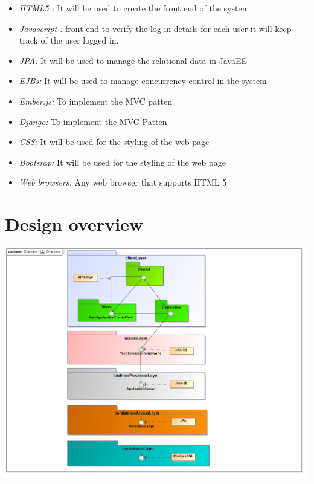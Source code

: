 \documentclass[a4paper,12pt]{article}
\begin{document}
\begin{itemize}
	\item \textit{HTML5 : }It will be used to create the front end of the system
\end{itemize}
\begin{itemize}
	\item \textit{Javascript :} front end to verify the log in details for each user it will keep track of the user logged in.
\end{itemize}
\begin{itemize}
	\item \textit{JPA:} It will be used to manage the relational data in JavaEE
\end{itemize}
\begin{itemize}
	\item \textit{EJBs:} It will be used to manage concurrency control in the system
\end{itemize}
\begin{itemize}
	\item \textit{Ember.js:} To implement the MVC patten
\end{itemize}
\begin{itemize}
	\item \textit{Django:} To implement the MVC Patten
\end{itemize}
\begin{itemize}
	\item \textit{CSS:} It will be used for the styling of the web page
\end{itemize}
\begin{itemize}
	\item \textit{Bootsrap:} It will be used for the styling of the web page 
\end{itemize}
\begin{itemize}
	\item \textit{Web browsers:} Any web browser that supports HTML 5
\end{itemize}

\section{Design overview}
\includegraphics[width=1\textwidth]{./Images/Overview.png}
\end{document}
